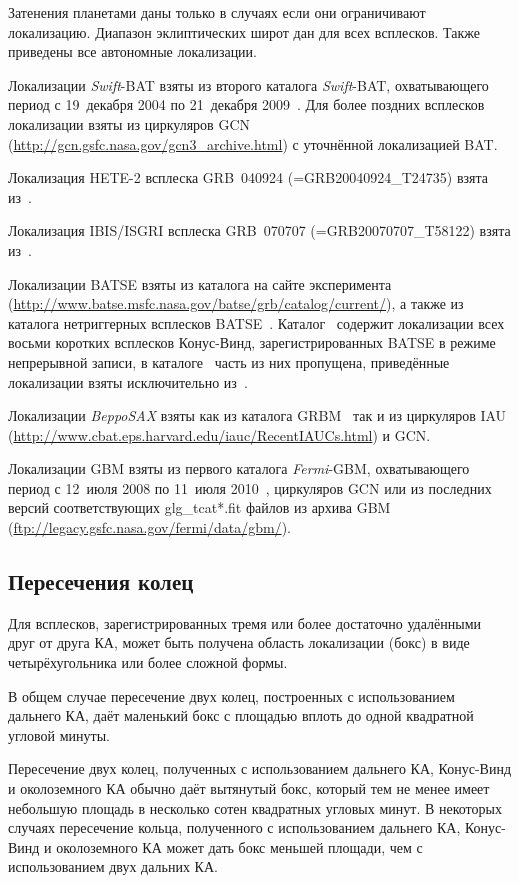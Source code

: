 Затенения планетами даны только в случаях если они ограничивают локализацию. 
Диапазон эклиптических широт дан для всех всплесков. Также приведены все автономные 
локализации.

Локализации \textit{Swift}-BAT взяты из второго каталога \textit{Swift}-BAT, 
охватывающего период с 19~декабря 2004 по 21~декабря 2009~\citep{Sakamoto_2011ApJS}. 
Для более поздних всплесков локализации взяты из циркуляров GCN 
(\url{http://gcn.gsfc.nasa.gov/gcn3_archive.html}) с уточнённой локализацией BAT.

Локализация HETE-2 всплеска GRB~040924 (=GRB20040924\_T24735) взята из~\citep{Arimoto_2006GCN}.

Локализация IBIS/ISGRI всплеска GRB~070707 (=GRB20070707\_T58122) взята из~\citep{Gotz_2007GCN}.

Локализации BATSE взяты из каталога на сайте эксперимента 
(\url{http://www.batse.msfc.nasa.gov/batse/grb/catalog/current/}), а также из каталога 
нетриггерных всплесков BATSE~\citep{Kommers_2000ApJ, Stern_2001ApJ}. Каталог~\citep{Stern_2001ApJ} 
содержит локализации всех восьми коротких всплесков Конус-Винд, зарегистрированных BATSE 
в режиме непрерывной записи, в каталоге~\citep{Kommers_2000ApJ} часть из них пропущена, 
приведённые локализации взяты исключительно из~\citep{Stern_2001ApJ}.

Локализации \textit{BeppoSAX} взяты как из каталога GRBM~\citep{Frontera_2009ApJS} 
так и из циркуляров IAU (\url{http://www.cbat.eps.harvard.edu/iauc/RecentIAUCs.html}) 
и GCN. 

Локализации GBM взяты из первого каталога \textit{Fermi}-GBM, охватывающего период с
12~июля 2008 по 11~июля 2010~\citep{Paciesas_2012ApJS}, циркуляров GCN или из последних 
версий соответствующих glg\_tcat*.fit файлов из архива GBM 
(\url{ftp://legacy.gsfc.nasa.gov/fermi/data/gbm/}).

\subsection{Пересечения колец}
Для всплесков, зарегистрированных тремя или более достаточно удалёнными друг от 
друга КА, может быть получена область локализации (бокс) в виде четырёхугольника 
или более сложной формы.

В общем случае пересечение двух колец, построенных с использованием дальнего КА,
даёт маленький бокс с площадью вплоть до одной квадратной угловой минуты.

Пересечение двух колец, полученных с использованием дальнего КА, Конус-Винд и
околоземного КА обычно даёт вытянутый бокс, который тем не менее имеет небольшую
площадь в несколько сотен квадратных угловых минут. В некоторых случаях пересечение кольца, полученного
с использованием дальнего КА, Конус-Винд и околоземного КА может дать бокс меньшей
площади, чем с использованием двух дальних КА.

